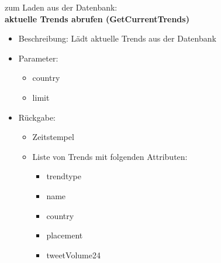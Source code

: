 \documentclass[conference]{IEEEtran}
\begin{document}
zum Laden aus der Datenbank:
\\
\smallskip
\textbf{aktuelle Trends abrufen (GetCurrentTrends)}
\begin{itemize}
    \item Beschreibung: Lädt aktuelle Trends aus der Datenbank
    \item Parameter:
          \begin{itemize}
              \item country
              \item limit
          \end{itemize}
    \item Rückgabe:
          \begin{itemize}
              \item Zeitstempel
              \item Liste von Trends mit folgenden Attributen:
                    \begin{itemize}
                        \item trendtype
                        \item name
                        \item country
                        \item placement
                        \item tweetVolume24
                    \end{itemize}
          \end{itemize}
\end{itemize}
\end{document}
